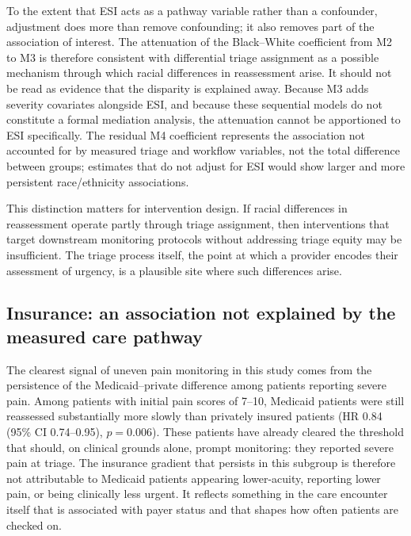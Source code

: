 \documentclass[11pt]{article}
\newcommand{\HRMedicaidSevere}{0.84 (95\% CI 0.74--0.95), $p=0.006$}
\begin{document}
To the extent that ESI acts as a pathway variable rather than a confounder, adjustment does more than remove confounding; it also removes part of the association of interest.
The attenuation of the Black--White coefficient from M2 to M3 is therefore consistent with differential triage assignment as a possible mechanism through which racial differences in reassessment arise.
It should not be read as evidence that the disparity is explained away.
Because M3 adds severity covariates alongside ESI, and because these sequential models do not constitute a formal mediation analysis, the attenuation cannot be apportioned to ESI specifically.
The residual M4 coefficient represents the association not accounted for by measured triage and workflow variables, not the total difference between groups; estimates that do not adjust for ESI would show larger and more persistent race/ethnicity associations.

This distinction matters for intervention design.
If racial differences in reassessment operate partly through triage assignment, then interventions that target downstream monitoring protocols without addressing triage equity may be insufficient.
The triage process itself, the point at which a provider encodes their assessment of urgency, is a plausible site where such differences arise.

\subsection{Insurance: an association not explained by the measured care pathway}

The clearest signal of uneven pain monitoring in this study comes from the persistence of the Medicaid--private difference among patients reporting severe pain.
Among patients with initial pain scores of 7--10, Medicaid patients were still reassessed substantially more slowly than privately insured patients (HR \HRMedicaidSevere{}).
These patients have already cleared the threshold that should, on clinical grounds alone, prompt monitoring: they reported severe pain at triage.
The insurance gradient that persists in this subgroup is therefore not attributable to Medicaid patients appearing lower-acuity, reporting lower pain, or being clinically less urgent.
It reflects something in the care encounter itself that is associated with payer status and that shapes how often patients are checked on.
\end{document}
